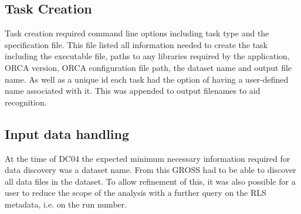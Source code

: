 
\subsection{Task Creation}

Task creation required command line options including task type and the specification file. This file listed all information needed to create the task including the executable file, paths to any libraries required by the application, ORCA version, ORCA configuration file path, the dataset name and output file name. As well as a unique id each task had the option of having a user-defined name associated with it. This was appended to output filenames to aid recognition.


\subsection{Input data handling}
At the time of DC04 the expected minimum necessary information required for data discovery was a dataset name. From this GROSS had to be able to discover all data files in the dataset. To allow refinement of this, it was also possible for a user to reduce the scope of the analysis with a further query on the RLS metadata, i.e. on the run number.

